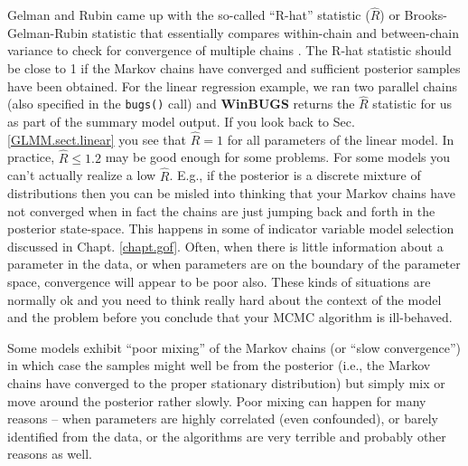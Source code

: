 Gelman and Rubin came up with the so-called ``R-hat''
statistic ($\hat{R}$) or Brooks-Gelman-Rubin statistic that
essentially compares within-chain and between-chain variance to check
for convergence of multiple chains \citep{gelman_etal:1996}. The R-hat statistic
should be close to 1 if the Markov chains have converged and
sufficient posterior samples have been obtained. For the linear regression example, we ran two parallel chains (also specified in the {\tt bugs()} call) and {\bf WinBUGS} returns the $\hat{R}$ statistic for us as part of the summary model output. If you look back to Sec. \ref{GLMM.sect.linear} you see that $\hat{R} = 1$ for all parameters of the linear model.
In practice, $\hat{R}
\leq 1.2$ may be good enough for some problems.  For some models you
can't actually realize a low $\hat{R}$. E.g., if the posterior is a
discrete mixture of distributions then you can be misled into thinking
that your Markov chains have not converged when in fact the chains are
just jumping back and forth in the posterior state-space. This happens
in some of indicator variable model selection discussed in Chapt. \ref{chapt.gof}.
Often, when there is little information about a parameter in the data,
or when parameters are on the boundary of the parameter space,
convergence will appear to be poor also.
These kinds of situations 
are normally ok and you need to think really hard about
the context of the model and the problem before you conclude that your
MCMC algorithm is ill-behaved.

Some models exhibit ``poor mixing'' of the Markov chains (or ``slow
convergence'') in which case the samples might well be from the
posterior (i.e., the Markov chains have converged to the proper
stationary distribution) but simply mix or move around the posterior
rather slowly. Poor mixing can happen for many reasons -- when
parameters are highly correlated (even confounded), or barely
identified from the data, or the algorithms are very terrible and
probably other reasons as well.

